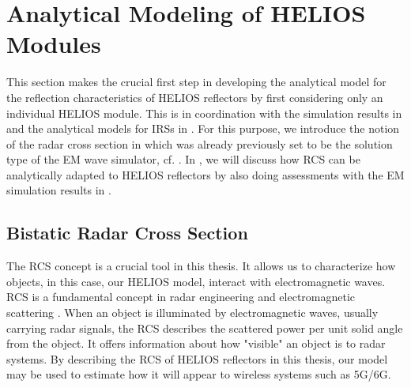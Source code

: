 \section{Analytical Modeling of HELIOS Modules} \label{Analytical Modeling of HELIOS Modules}
This section makes the crucial first step in developing the analytical model for the reflection characteristics of HELIOS reflectors by first considering only an individual HELIOS module. This is in coordination with the simulation results in  and the analytical models for IRSs in . For this purpose, we introduce the notion of the radar cross section in  which was already previously set to be the solution type of the EM wave simulator, cf. . In , we will discuss how RCS can be analytically adapted to HELIOS reflectors by also doing assessments with the EM simulation results in .
\subsection{Bistatic Radar Cross Section} \label{Radar-Cross-Section and Radar Equation}
The \ac{RCS} concept is a crucial tool in this thesis. It allows us to characterize how objects, in this case, our HELIOS model, interact with electromagnetic waves. \ac{RCS} is a fundamental concept in radar engineering and electromagnetic scattering \cite{Balanis, Kerr1989PropagationOS}. When an object is illuminated by electromagnetic waves, usually carrying radar signals, the \ac{RCS} describes the scattered power per unit solid angle from the object. It offers information about how "visible" an object is to radar systems. By describing the RCS of HELIOS reflectors in this thesis, our model may be used to estimate how it will appear to wireless systems such as 5G/6G.

